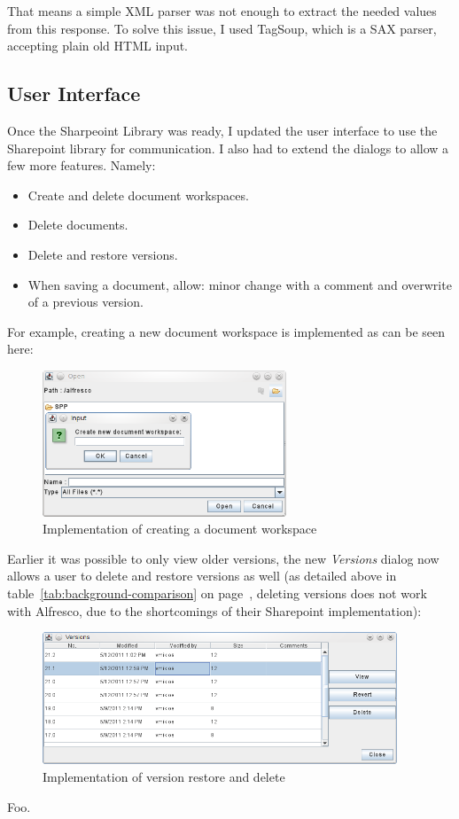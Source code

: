 That means a simple XML parser was not enough to extract the needed values from
this response. To solve this issue, I used TagSoup\cite{tagsoup}, which is a
SAX parser, accepting plain old HTML input.

\subsection{User Interface}

Once the Sharpeoint Library was ready, I updated the user interface to use the
Sharepoint library for communication. I also had to extend the dialogs to allow
a few more features. Namely:

\begin{itemize}
\item Create and delete document workspaces.
\item Delete documents.
\item Delete and restore versions.
\item When saving a document, allow: minor change with a comment and overwrite of a previous version.
\end{itemize}

For example, creating a new document workspace is implemented as can be seen
here:

\begin{figure}[H]
\centering
\includegraphics[width=275px,keepaspectratio]{implementation-createdws.png}
\caption{Implementation of creating a document workspace}
\end{figure}

Earlier it was possible to only view older versions, the new \emph{Versions}
dialog now allows a user to delete and restore versions as well (as detailed
above in table~\ref{tab:background-comparison} on
page~\pageref{tab:background-comparison}, deleting versions does not work with
Alfresco, due to the shortcomings of their Sharepoint implementation):

\begin{figure}[H]
\centering
\includegraphics[width=400px,keepaspectratio]{implementation-versiondialog.png}
\caption{Implementation of version restore and delete}
\end{figure}

Foo.
